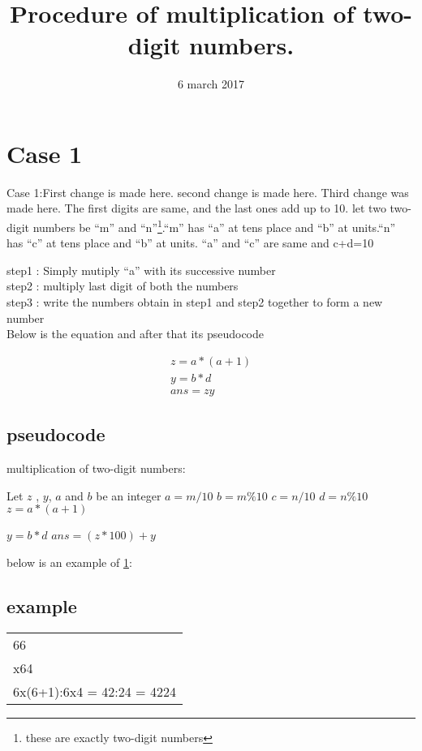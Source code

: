 \documentclass{article}
\title{\huge Procedure of multiplication of two-digit numbers.}
\date{6 march 2017}
\begin{document}
\begin{titlepage}
\maketitle
\end{titlepage}
\newpage
\section{Case 1} \label{case 1}
\noindent Case 1:First change is made here.
second change is made here.
Third change was made here.  The first digits are same, and the last ones add up to 10.
let two two-digit numbers be ``m'' and ``n''\footnote{these are exactly two-digit numbers}.``m'' has ``a'' at tens place and ``b'' at units.``n'' has ``c'' at tens place and ``b'' at units. ``a'' and ``c'' are same and c+d=10\cite{athar}

\noindent step1 : Simply mutiply ``a'' with its successive number \\
step2 : multiply last digit of both the numbers \\
step3 : write the numbers obtain in step1 and step2 together to form a new number\\

\noindent Below is the equation and after that its pseudocode


\begin{align*}
	z=a*(a+1)  \\
	y=b*d \\
	ans=zy
	\end{align*}
\subsection{pseudocode}
  \begin{algorithm}
   \caption{multiplication of two-digit numbers: }
    \begin{algorithmic}[1]
	\State 

	\State Let $z$ , $y$, $a$ and $b$ be an integer
\State $a=m/10$
\State $b=m\%10$
\State $c=n/10$
\State $d=n\%10$
	\State $z=a*(a+1)$
	
	\State $y=b*d$
	\State $ans=(z*100)+y$ 
	
	\EndIf
	\EndFunction
\end{algorithmic}
\end{algorithm}
\noindent below is an example of \ref{case 1}:
\newline
\subsection{example}
\begin{tabular}{l} 
66\\

x64\\

6x(6+1):6x4 = 42:24 = 4224\\
\end{tabular}
\end{document}
